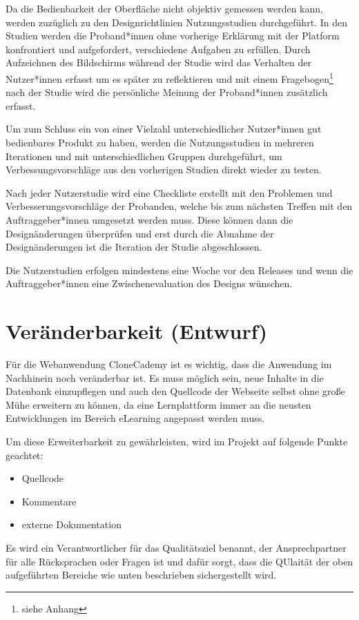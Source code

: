 \documentclass[accentcolor=tud0b,12pt,paper=a4]{tudreport}
\begin{document}
Da die Bedienbarkeit der Oberfläche nicht objektiv gemessen werden kann, werden zuzüglich zu den Designrichtlinien Nutzungsstudien durchgeführt. In den Studien werden die Proband*innen ohne vorherige Erklärung mit der Platform konfrontiert und aufgefordert, verschiedene Aufgaben zu erfüllen. Durch Aufzeichnen des Bildschirms während der Studie wird das Verhalten der Nutzer*innen erfasst um es später zu reflektieren und mit einem Fragebogen\footnote{siehe Anhang} nach der Studie wird die persönliche Meinung der Proband*innen zusätzlich erfasst.

Um zum Schluss ein von einer Vielzahl unterschiedlicher Nutzer*innen gut bedienbares Produkt zu haben, werden die Nutzungsstudien in mehreren Iterationen und mit unterschiedlichen Gruppen durchgeführt, um Verbessungsvorschläge aus den vorherigen Studien direkt wieder zu testen. 

Nach jeder Nutzerstudie wird eine Checkliste erstellt mit den Problemen und Verbesserungsvorschläge der Probanden, welche bis zum nächsten Treffen mit den Auftraggeber*innen umgesetzt werden muss. Diese können dann die Designänderungen überprüfen und erst durch die Abnahme der Designänderungen ist die Iteration der Studie abgeschlossen.

Die Nutzerstudien erfolgen mindestens eine Woche vor den Releases und wenn die Auftraggeber*innen eine Zwischenevaluation des Designs wünschen.

\section{Veränderbarkeit (Entwurf)}
Für die Webanwendung CloneCademy ist es wichtig, dass die Anwendung im Nachhinein noch veränderbar ist. Es muss möglich sein, neue Inhalte in die Datenbank einzupflegen und auch den Quellcode der Webseite selbst ohne große Mühe erweitern zu können, da eine Lernplattform immer an die neusten Entwicklungen im Bereich eLearning angepasst werden muss.

Um diese Erweiterbarkeit zu gewährleisten, wird im Projekt auf folgende Punkte geachtet:
\begin{itemize}
	\item Quellcode
	\item Kommentare
	\item externe Dokumentation
\end{itemize}

Es wird ein Verantwortlicher für das Qualitätsziel benannt, der Ansprechpartner für alle Rücksprachen oder Fragen ist und dafür sorgt, dass die QUlaität der oben aufgeführten Bereiche wie unten beschrieben sichergestellt wird.
\end{document}
